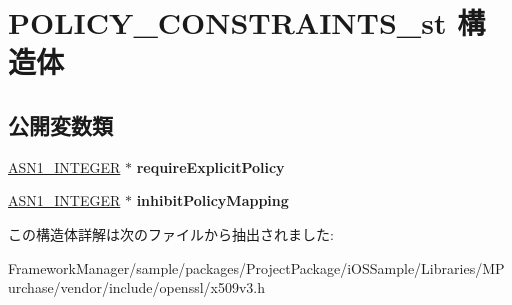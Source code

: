 \hypertarget{struct_p_o_l_i_c_y___c_o_n_s_t_r_a_i_n_t_s__st}{}\section{P\+O\+L\+I\+C\+Y\+\_\+\+C\+O\+N\+S\+T\+R\+A\+I\+N\+T\+S\+\_\+st 構造体}
\label{struct_p_o_l_i_c_y___c_o_n_s_t_r_a_i_n_t_s__st}
\subsection*{公開変数類}
\begin{DoxyCompactItemize}
\item 
\hypertarget{struct_p_o_l_i_c_y___c_o_n_s_t_r_a_i_n_t_s__st_ac20a75b7ea96a9f0c0449966cdbe77b8}{}\hyperlink{structasn1__string__st}{A\+S\+N1\+\_\+\+I\+N\+T\+E\+G\+E\+R} $\ast$ {\bfseries require\+Explicit\+Policy}\label{struct_p_o_l_i_c_y___c_o_n_s_t_r_a_i_n_t_s__st_ac20a75b7ea96a9f0c0449966cdbe77b8}

\item 
\hypertarget{struct_p_o_l_i_c_y___c_o_n_s_t_r_a_i_n_t_s__st_a1621bfef679b688916f7ec401d071c01}{}\hyperlink{structasn1__string__st}{A\+S\+N1\+\_\+\+I\+N\+T\+E\+G\+E\+R} $\ast$ {\bfseries inhibit\+Policy\+Mapping}\label{struct_p_o_l_i_c_y___c_o_n_s_t_r_a_i_n_t_s__st_a1621bfef679b688916f7ec401d071c01}

\end{DoxyCompactItemize}


この構造体詳解は次のファイルから抽出されました\+:\begin{DoxyCompactItemize}
\item 
Framework\+Manager/sample/packages/\+Project\+Package/i\+O\+S\+Sample/\+Libraries/\+M\+Purchase/vendor/include/openssl/x509v3.\+h\end{DoxyCompactItemize}
